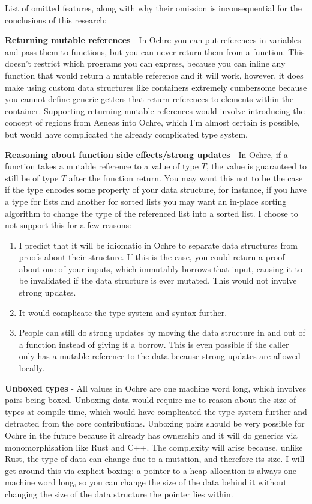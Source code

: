 \documentclass[12pt,twoside]{report}
\begin{document}
List of omitted features, along with why their omission is inconsequential for the conclusions of this research:

\textbf{Returning mutable references} - In Ochre you can put references in variables and pass them to functions, but you can never return them from a function. This doesn't restrict which programs you can express, because you can inline any function that would return a mutable reference and it will work, however, it does make using custom data structures like containers extremely cumbersome because you cannot define generic getters that return references to elements within the container. Supporting returning mutable references would involve introducing the concept of regions from Aeneas into Ochre, which I'm almost certain is possible, but would have complicated the already complicated type system.

\textbf{Reasoning about function side effects/strong updates} - In Ochre, if a function takes a mutable reference to a value of type $T$, the value is guaranteed to still be of type $T$ after the function return. You may want this not to be the case if the type encodes some property of your data structure, for instance, if you have a type for lists and another for sorted lists you may want an in-place sorting algorithm to change the type of the referenced list into a sorted list. I choose to not support this for a few reasons:
\begin{enumerate}
  \item I predict that it will be idiomatic in Ochre to separate data structures from proofs about their structure. If this is the case, you could return a proof about one of your inputs, which immutably borrows that input, causing it to be invalidated if the data structure is ever mutated. This would not involve strong updates.
  \item It would complicate the type system and syntax further.
  \item People can still do strong updates by moving the data structure in and out of a function instead of giving it a borrow. This is even possible if the caller only has a mutable reference to the data because strong updates are allowed locally.
\end{enumerate}

\textbf{Unboxed types} - All values in Ochre are one machine word long, which involves pairs being boxed. Unboxing data would require me to reason about the size of types at compile time, which would have complicated the type system further and detracted from the core contributions. Unboxing pairs should be very possible for Ochre in the future because it already has ownership and it will do generics via monomorphisation like Rust and C++. The complexity will arise because, unlike Rust, the type of data can change due to a mutation, and therefore its size. I will get around this via explicit boxing: a pointer to a heap allocation is always one machine word long, so you can change the size of the data behind it without changing the size of the data structure the pointer lies within.
\end{document}
